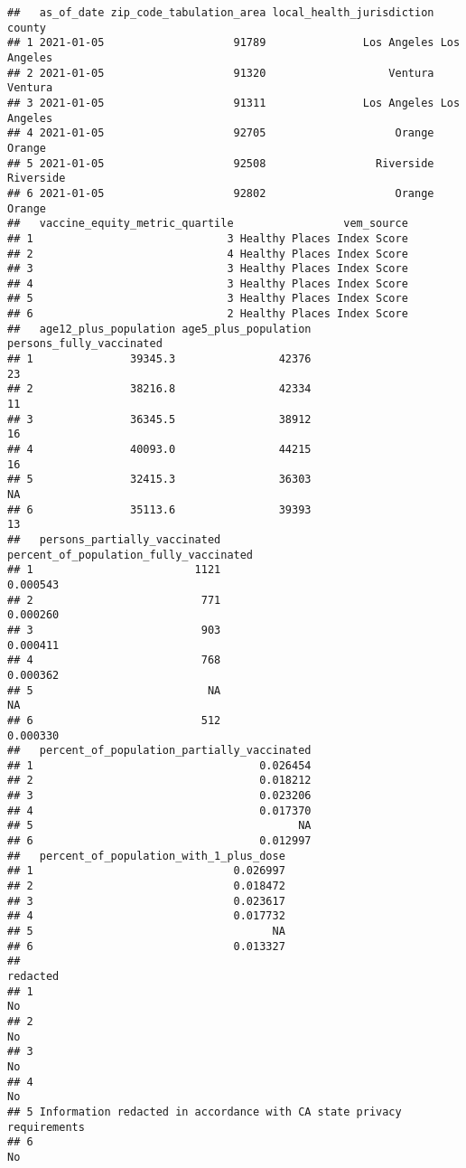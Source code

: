 \documentclass[
]{article}
\begin{document}
\begin{verbatim}
##   as_of_date zip_code_tabulation_area local_health_jurisdiction      county
## 1 2021-01-05                    91789               Los Angeles Los Angeles
## 2 2021-01-05                    91320                   Ventura     Ventura
## 3 2021-01-05                    91311               Los Angeles Los Angeles
## 4 2021-01-05                    92705                    Orange      Orange
## 5 2021-01-05                    92508                 Riverside   Riverside
## 6 2021-01-05                    92802                    Orange      Orange
##   vaccine_equity_metric_quartile                 vem_source
## 1                              3 Healthy Places Index Score
## 2                              4 Healthy Places Index Score
## 3                              3 Healthy Places Index Score
## 4                              3 Healthy Places Index Score
## 5                              3 Healthy Places Index Score
## 6                              2 Healthy Places Index Score
##   age12_plus_population age5_plus_population persons_fully_vaccinated
## 1               39345.3                42376                       23
## 2               38216.8                42334                       11
## 3               36345.5                38912                       16
## 4               40093.0                44215                       16
## 5               32415.3                36303                       NA
## 6               35113.6                39393                       13
##   persons_partially_vaccinated percent_of_population_fully_vaccinated
## 1                         1121                               0.000543
## 2                          771                               0.000260
## 3                          903                               0.000411
## 4                          768                               0.000362
## 5                           NA                                     NA
## 6                          512                               0.000330
##   percent_of_population_partially_vaccinated
## 1                                   0.026454
## 2                                   0.018212
## 3                                   0.023206
## 4                                   0.017370
## 5                                         NA
## 6                                   0.012997
##   percent_of_population_with_1_plus_dose
## 1                               0.026997
## 2                               0.018472
## 3                               0.023617
## 4                               0.017732
## 5                                     NA
## 6                               0.013327
##                                                                redacted
## 1                                                                    No
## 2                                                                    No
## 3                                                                    No
## 4                                                                    No
## 5 Information redacted in accordance with CA state privacy requirements
## 6                                                                    No
\end{verbatim}
\end{document}
